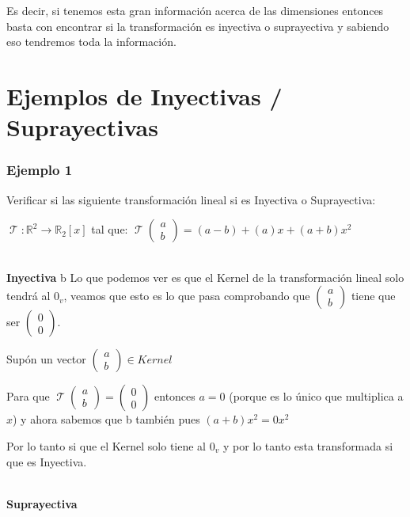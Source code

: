 \documentclass[12pt]{report}                                    %
\DeclareMathOperator \LinealTransformation {\mathcal{T}}        %
\DeclareMathOperator \LT {\mathcal{T}}                          %
\newcommand{\pVector}[1]{                                       %
        \ensuremath{\begin{pmatrix}#1\end{pmatrix}}                 %
    }
\begin{document}
                Es decir, si tenemos esta gran información acerca de las dimensiones
                entonces basta con encontrar si la transformación es inyectiva o suprayectiva
                y sabiendo eso tendremos toda la información.





    \clearpage
    \section{Ejemplos de Inyectivas / Suprayectivas}


            \subsubsection{\large Ejemplo 1}
            Verificar si las siguiente transformación lineal si es Inyectiva o Suprayectiva:

            $\LinealTransformation : \mathbb{R}^2 \to \mathbb{R}_2[x]$ tal que: 
            $\LinealTransformation \pVector{a\\b} = (a-b) + (a)x + (a+b)x^2$

            \textbf{\\Inyectiva}
            b
            Lo que podemos ver es que el Kernel de la transformación lineal
            solo tendrá al $0_v$, veamos que esto es lo que pasa comprobando que $\pVector{a\\b}$
            tiene que ser $\pVector{0\\0}$.

            Supón un vector $\pVector{a\\b} \in Kernel$

            Para que $\LT\pVector{a\\b} = \pVector{0\\0}$ entonces $a=0$ (porque es lo 
            único que multiplica a $x$) y ahora sabemos que b también pues $(a+b)x^2=0x^2$

            Por lo tanto si que el Kernel solo tiene al $0_v$
            y por lo tanto esta transformada si que es Inyectiva.


            \textbf{\\Suprayectiva}
\end{document}
